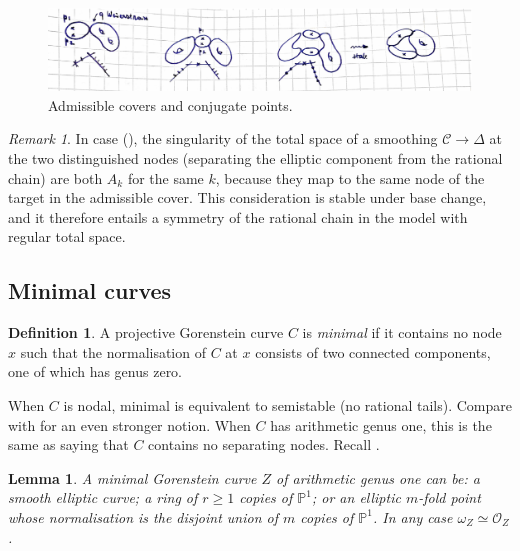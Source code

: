 \documentclass{compositio}
\newcommand{\PP}{\mathbb P}
\newcommand{\OO}{\mathcal O}
\renewcommand{\to}{\rightarrow}
\newcommand{\dvr}{\Delta}
\theoremstyle{plain}
\newtheorem{lem}[thm]{Lemma}
\theoremstyle{definition}
\newtheorem{definition}[thm]{Definition}
\theoremstyle{remark}
\newtheorem{rem}[thm]{Remark}
\begin{document}
\begin{itemize}[leftmargin=.5cm]
  \begin{figure}[!ht]
 \includegraphics[width=\textwidth]{admissible_conjugate}  
 \caption{Admissible covers and conjugate points.}\label{fig:adm_conj}
  \end{figure}
 \end{itemize}
 
 \begin{rem}\label{rmk:necklace_symmetry}
  In case (\dag), the singularity of the total space of a smoothing $\mathcal C\to\dvr$ at the two distinguished nodes (separating the elliptic component from the rational chain) are both $A_k$ for the same $k$, because they map to the same node of the target in the admissible cover. This consideration is stable under base change, and it therefore entails a symmetry of the rational chain in the model with regular total space.
 \end{rem}
 
 \subsection{Minimal curves}
 \begin{definition}
  A projective Gorenstein curve $C$ is \emph{minimal} if it contains no node $x$ such that the normalisation of $C$ at $x$ consists of two connected components, one of which has genus zero.
 \end{definition}

 When $C$ is nodal, minimal is equivalent to semistable (no rational tails). Compare with \cite[Definition 3.2]{Catanese} for an even stronger notion. When $C$ has arithmetic genus one, this is the same as saying that $C$ contains no separating nodes. Recall \cite[Lemma 3.3]{SMY1}.

\begin{lem}\label{lem:min1}
 A minimal Gorenstein curve $Z$ of arithmetic genus one can be: a smooth elliptic curve; a ring of $r\geq 1$ copies of $\PP^1$; or an elliptic $m$-fold point whose normalisation is the disjoint union of $m$ copies of $\PP^1$. In any case $\omega_Z\simeq\OO_Z$.
\end{lem}
\end{document}
